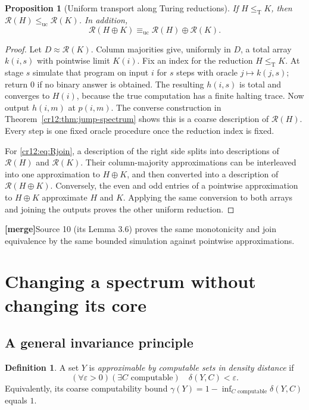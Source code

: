\documentclass[11pt,letterpaper]{article}
\theoremstyle{plain}
\newtheorem{proposition}[theorem]{Proposition}
\theoremstyle{definition}
\newtheorem{definition}[theorem]{Definition}
\theoremstyle{remark}
\numberwithin{equation}{section}
\newcommand{\leT}{\leq_{\mathrm T}}
\newcommand{\leuc}{\leq_{\mathrm{uc}}}
\newcommand{\equc}{\equiv_{\mathrm{uc}}}
\newcommand{\Rcode}{\mathcal R}
\newcommand{\mergenote}[1]{\par\smallskip\noindent
 {\small\textsf{\textbf{[merge]}}\enspace #1}\par\smallskip}
\begin{document}
\begin{proposition}[Uniform transport along Turing reductions]\label{cr12:prop:transport}
If $H\leT K$, then $\Rcode(H)\leuc\Rcode(K)$. In addition,
\begin{equation}\label{cr12:eq:Rjoin}
 \Rcode(H\oplus K)\equc\Rcode(H)\oplus\Rcode(K).
\end{equation}
\end{proposition}
\begin{proof}
Let $D\approx\Rcode(K)$. Column majorities give, uniformly in $D$, a total
array $k(i,s)$ with pointwise limit $K(i)$. Fix an index for the reduction
$H\leT K$. At stage $s$ simulate that program on input $i$ for $s$ steps with
oracle $j\mapsto k(j,s)$; return $0$ if no binary answer is obtained. The
resulting $h(i,s)$ is total and converges to $H(i)$, because the true computation
has a finite halting trace. Now output $h(i,m)$ at $p(i,m)$. The converse
construction in Theorem~\ref{cr12:thm:jump-spectrum} shows this is a coarse description
of $\Rcode(H)$. Every step is one fixed oracle procedure once the reduction
index is fixed.

For \eqref{cr12:eq:Rjoin}, a description of the right side splits into descriptions
of $\Rcode(H)$ and $\Rcode(K)$. Their column-majority approximations can be
interleaved into one approximation to $H\oplus K$, and then converted into a
description of $\Rcode(H\oplus K)$. Conversely, the even and odd entries of a
pointwise approximation to $H\oplus K$ approximate $H$ and $K$. Applying the
same conversion to both arrays and joining the outputs proves the other uniform
reduction.
\end{proof}
\mergenote{Source 10 (its Lemma 3.6) proves the same monotonicity and join equivalence
by the same bounded simulation against pointwise approximations.}

\section{Changing a spectrum without changing its core}\label{cr12:sec:neutral}
\subsection{A general invariance principle}
\begin{definition}
A set $Y$ is \emph{approximable by computable sets in density distance} if
\begin{equation}\label{cr12:eq:approximable}
 (\forall\varepsilon>0)(\exists C\text{ computable})\quad
 \delta(Y,C)<\varepsilon.
\end{equation}
Equivalently, its coarse computability bound
$\gamma(Y)=1-\inf_{C\text{ computable}}\delta(Y,C)$ equals $1$.
\end{definition}
\end{document}
